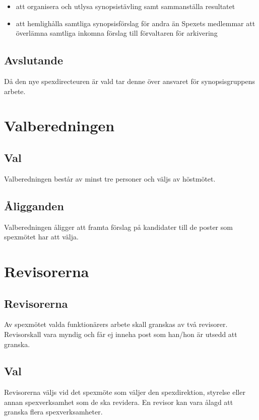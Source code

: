 \documentclass[a4paper]{article}
\begin{document}
\begin{itemize}
  \item att organisera och utlysa synopsistävling samt sammanställa resultatet
  \item att hemlighålla samtliga synopsisförslag för andra än Spexets medlemmar att överlämna samtliga inkomna förslag till förvaltaren för arkivering
\end{itemize}

\subsection{Avslutande}
Då den nye spexdirecteuren är vald tar denne över ansvaret för synopsisgruppens arbete.

\section{Valberedningen}
\label{section:valberedningen}

\subsection{Val}
Valberedningen består av minst tre personer och väljs av höstmötet.

\subsection{Åligganden}
Valberedningen åligger att framta förslag på kandidater till de poster som spexmötet har att välja.

\section{Revisorerna}
\label{section:revisorerna}

\subsection{Revisorerna}
Av spexmötet valda funktionärers arbete skall granskas av två revisorer. Revisorskall vara myndig och får ej inneha post som han/hon är utsedd att granska.

\subsection{Val}
Revisorerna väljs vid det spexmöte som väljer den spexdirektion, styrelse eller annan spexverksamhet som de ska revidera. En revisor kan vara ålagd att granska flera spexverksamheter.
\end{document}
